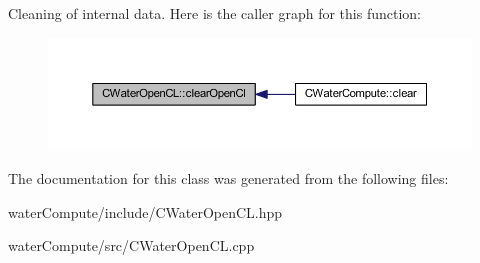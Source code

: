 Cleaning of internal data. Here is the caller graph for this function\+:
\nopagebreak
\begin{figure}[H]
\begin{center}
\leavevmode
\includegraphics[width=350pt]{class_c_water_open_c_l_a213bd842a23c3a1d50e90b60d9395143_icgraph}
\end{center}
\end{figure}


The documentation for this class was generated from the following files\+:\begin{DoxyCompactItemize}
\item 
water\+Compute/include/C\+Water\+Open\+C\+L.\+hpp\item 
water\+Compute/src/C\+Water\+Open\+C\+L.\+cpp\end{DoxyCompactItemize}
